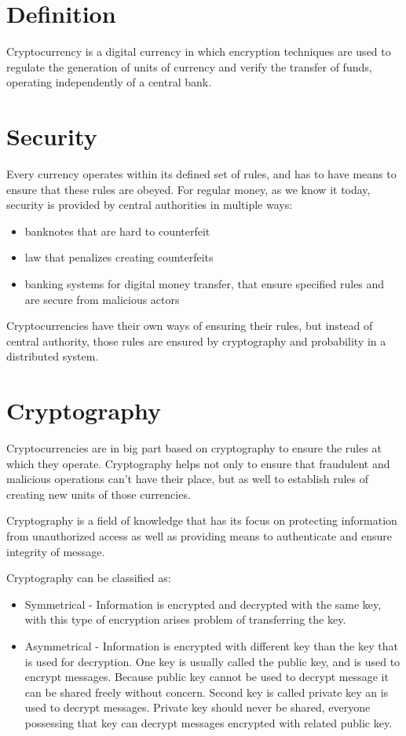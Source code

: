 \documentclass[12pt, en, eng, oneside]{mgr}
\begin{document}
\section{Definition}
Cryptocurrency is a digital currency in which encryption techniques are used to regulate the generation of units of currency and verify the transfer of funds, operating independently of a central bank. \cite{crypto-def}

\section{Security}
Every currency operates within its defined set of rules, and has to have means to ensure that these rules are obeyed. For regular money, as we know it today, security is provided by central authorities in multiple ways:
\begin{itemize}
\item
banknotes that are hard to counterfeit
\item
law that penalizes creating counterfeits
\item
banking systems for digital money transfer, that ensure specified rules and are secure from malicious actors
\end{itemize}

Cryptocurrencies have their own ways of ensuring their rules, but instead of central authority, those rules are ensured by cryptography and probability in a distributed system.

\section{Cryptography}
Cryptocurrencies are in big part based on cryptography to ensure the rules at which they operate. Cryptography helps not only to ensure that fraudulent and malicious operations can't have their place, but as well to establish rules of creating new units of those currencies. 

Cryptography is a field of knowledge that has its focus on protecting information from unauthorized access as well as providing means to authenticate and ensure integrity of message.

Cryptography can be classified as:

\begin{itemize}
\item
Symmetrical - Information is encrypted and decrypted with the same key, with this type of encryption arises problem of transferring the key.
\item
Asymmetrical - Information is encrypted with different key than the key that is used for decryption. One key is usually called the public key, and is used to encrypt messages. Because public key cannot be used to decrypt message it can be shared freely without concern. Second key is called private key an is used to decrypt messages. Private key should never be shared, everyone possessing that key can decrypt messages encrypted with related public key.
\end{itemize} 
\end{document}
